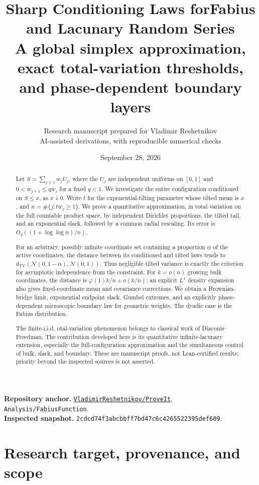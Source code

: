 \documentclass[11pt,letterpaper]{article}
\title{\vspace{-1.1em}\textbf{Sharp Conditioning Laws for\break Fabius and Lacunary Random Series}\\[.55em]
\large A global simplex approximation, exact total-variation thresholds,\\
and phase-dependent boundary layers}
\author{\normalsize Research manuscript prepared for Vladimir Reshetnikov\\
\small AI-assisted derivations, with reproducible numerical checks}
\date{September 28, 2026}
\numberwithin{equation}{section}
\theoremstyle{definition}
\theoremstyle{remark}
\newcommand{\TV}{d_{\mathrm{TV}}}
\newcommand{\Normal}{\mathcal N}
\begin{document}
\maketitle
\thispagestyle{empty}
\begin{abstract}
Let $S=\sum_{j\ge1}w_jU_j$, where the $U_j$ are independent uniforms on $[0,1]$
and $0<w_{j+1}\le q w_j$ for a fixed $q<1$. We investigate the entire configuration
conditioned on $S\le x$, as $x\downarrow0$. Write $t$ for the exponential-tilting
parameter whose tilted mean is $x$, and $n=\#\{j:tw_j\ge1\}$. We prove a
quantitative approximation, in total variation on the full countable product
space, by independent Dirichlet proportions, the tilted tail, and an exponential
slack, followed by a common radial rescaling. Its error is
$O_q((1+\log\log n)/n)$.

For an arbitrary, possibly infinite coordinate set containing a proportion
$\alpha$ of the active coordinates, the distance between its conditioned and
tilted laws tends to
$\TV(\Normal(0,1-\alpha),\Normal(0,1))$. Thus negligible tilted variance is
exactly the criterion for asymptotic independence from the constraint.
For $k=o(n)$ growing bulk coordinates, the distance is
$\varphi(1)k/n+o(k/n)$; an explicit $L^1$ density expansion also gives fixed-coordinate
mean and covariance corrections. We obtain a Brownian-bridge limit, exponential
endpoint slack, Gumbel extremes, and an explicitly phase-dependent microscopic
boundary law for geometric weights. The dyadic case is the Fabius distribution.

The finite-i.i.d.	otal-variation phenomenon belongs to classical work of
Diaconis--Freedman. The contribution developed here is its quantitative
infinite-lacunary extension, especially the full-configuration approximation
and the simultaneous control of bulk, slack, and boundary. These are
manuscript proofs, not Lean-certified results; priority beyond the inspected
sources is not asserted.
\end{abstract}
\vfill
\noindent\textbf{Repository anchor.}\quad
\href{https://github.com/VladimirReshetnikov/ProveIt}{\texttt{VladimirReshetnikov/ProveIt}},
\texttt{Analysis/FabiusFunction}.\\
\textbf{Inspected snapshot.}\quad
{\small\texttt{2cdcd74f3abcbbff7bd47c6c4265522395def609}}.
\newpage
\tableofcontents
\newpage

\section{Research target, provenance, and scope}
\label{sec:scope}
\end{document}
